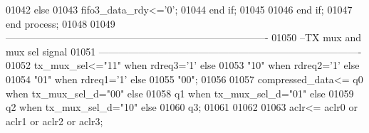 \begin{DoxyCode}
01042         \textcolor{keywordflow}{else} 
01043             \textcolor{vhdlchar}{fifo3_data_rdy}\textcolor{vhdlchar}{<=}\textcolor{vhdlchar}{'}\textcolor{vhdllogic}{}\textcolor{vhdllogic}{0}\textcolor{vhdlchar}{'};
01044         \textcolor{keywordflow}{end} \textcolor{keywordflow}{if};
01045           
01046         \textcolor{keywordflow}{end} \textcolor{keywordflow}{if};
01047     \textcolor{keywordflow}{end} \textcolor{keywordflow}{process};
01048      
01049 \textcolor{keyword}{-------------------------------------------------------------------------------}
01050 \textcolor{keyword}{--TX mux and mux sel signal}
01051 \textcolor{keyword}{-------------------------------------------------------------------------------  }
01052    \textcolor{vhdlchar}{tx_mux_sel}\textcolor{vhdlchar}{<=}\textcolor{vhdllogic}{"11"} \textcolor{keywordflow}{when}   \textcolor{vhdlchar}{rdreq3}\textcolor{vhdlchar}{=}\textcolor{vhdlchar}{'}\textcolor{vhdllogic}{}\textcolor{vhdllogic}{1}\textcolor{vhdlchar}{'} \textcolor{keywordflow}{else}
01053                     \textcolor{vhdllogic}{"10"} \textcolor{keywordflow}{when}   \textcolor{vhdlchar}{rdreq2}\textcolor{vhdlchar}{=}\textcolor{vhdlchar}{'}\textcolor{vhdllogic}{}\textcolor{vhdllogic}{1}\textcolor{vhdlchar}{'} \textcolor{keywordflow}{else}                         
01054                \textcolor{vhdllogic}{"01"} \textcolor{keywordflow}{when}    \textcolor{vhdlchar}{rdreq1}\textcolor{vhdlchar}{=}\textcolor{vhdlchar}{'}\textcolor{vhdllogic}{}\textcolor{vhdllogic}{1}\textcolor{vhdlchar}{'} \textcolor{keywordflow}{else}
01055                \textcolor{vhdllogic}{"00"};
01056               
01057     \textcolor{vhdlchar}{compressed_data}\textcolor{vhdlchar}{<=} \textcolor{vhdlchar}{q0} \textcolor{keywordflow}{when} \textcolor{vhdlchar}{tx_mux_sel_d}\textcolor{vhdlchar}{=}\textcolor{vhdllogic}{"00"} \textcolor{keywordflow}{else}
01058                 \textcolor{vhdlchar}{q1} \textcolor{keywordflow}{when} \textcolor{vhdlchar}{tx_mux_sel_d}\textcolor{vhdlchar}{=}\textcolor{vhdllogic}{"01"} \textcolor{keywordflow}{else}
01059                 \textcolor{vhdlchar}{q2} \textcolor{keywordflow}{when} \textcolor{vhdlchar}{tx_mux_sel_d}\textcolor{vhdlchar}{=}\textcolor{vhdllogic}{"10"} \textcolor{keywordflow}{else}
01060                 \textcolor{vhdlchar}{q3};
01061                       
01062                   
01063 \textcolor{vhdlchar}{aclr}\textcolor{vhdlchar}{<=} \textcolor{vhdlchar}{aclr0} \textcolor{keywordflow}{or} \textcolor{vhdlchar}{aclr1} \textcolor{keywordflow}{or} \textcolor{vhdlchar}{aclr2} \textcolor{keywordflow}{or} \textcolor{vhdlchar}{aclr3};

\end{DoxyCode}
